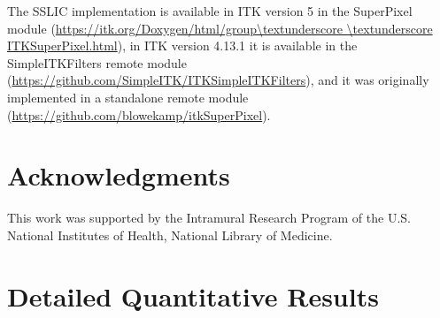 \documentclass{InsightArticle}
\begin{document}
The SSLIC implementation is available in ITK version 5 in the SuperPixel module (\url{https://itk.org/Doxygen/html/group\textunderscore \textunderscore ITKSuperPixel.html}), in ITK version 4.13.1 it is available in the SimpleITKFilters remote module (\url{https://github.com/SimpleITK/ITKSimpleITKFilters}), and it was originally implemented in a standalone remote module (\url{https://github.com/blowekamp/itkSuperPixel}).

\section*{Acknowledgments}

This work was supported by the Intramural Research Program of the U.S. National Institutes of Health, National
Library of Medicine.




\appendix
	
\newpage
	
\section{Detailed Quantitative Results}
\end{document}
